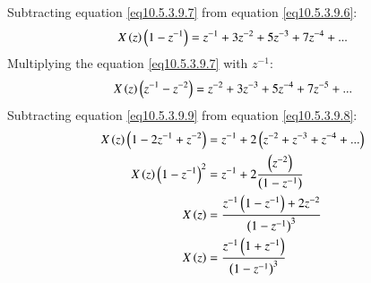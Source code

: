 \documentclass[journal,12pt,twocolumn]{IEEEtran}
\theoremstyle{remark}
\begin{document}
Subtracting equation \ref{eq10.5.3.9.7} from equation \ref{eq10.5.3.9.6}:
\begin{align}
X\left(z\right)\left(1-z^{-1}\right)=z^{-1}+3z^{-2}+5z^{-3}+7z^{-4}+...\label{eq10.5.3.9.8}
\end{align}
Multiplying the equation \ref{eq10.5.3.9.7} with $z^{-1}$:
\begin{align}
X\left(z\right)\left(z^{-1}-z^{-2}\right)=z^{-2}+3z^{-3}+5z^{-4}+7z^{-5}+...\label{eq10.5.3.9.9}
\end{align}
Subtracting equation \ref{eq10.5.3.9.9} from equation \ref{eq10.5.3.9.8}:
\begin{align}
X\left(z\right)\left(1-2z^{-1}+z^{-2}\right)&=z^{-1}+2\left(z^{-2}+z^{-3}+z^{-4}+...\right)  \\
X\left(z\right)\left(1-z^{-1}\right)^2&=z^{-1}+2\frac{\left(z^{-2}\right)}{\left(1-z^{-1}\right)}  \\
X\left(z\right)&=\frac{z^{-1}\left(1-z^{-1}\right)+2z^{-2}}{\left(1-z^{-1}\right)^3}  \\
X\left(z\right)&=\frac{z^{-1}\left(1+z^{-1}\right)}{\left(1-z^{-1}\right)^3}
\end{align}
\end{document}
